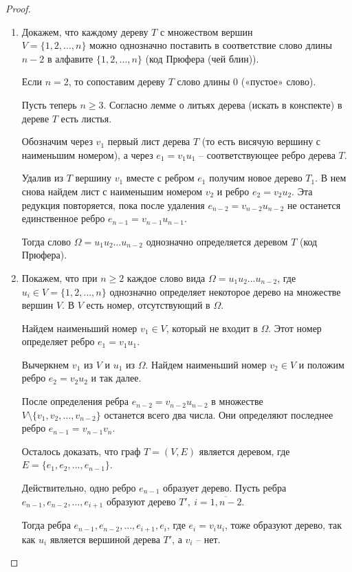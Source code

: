 \begin{proof}\leavevmode
    \begin{enumerate}
        \item Докажем, что каждому дереву $ T $ с множеством вершин \\ $ V = \{1,2,\ldots,n\} $ можно однозначно поставить в соответствие слово длины $ n-2 $ в алфавите $ \{1,2,\ldots,n\} $ (код Прюфера (чей блин)).

              Если $ n=2 $, то сопоставим дереву $ T $ слово длины $ 0 $ («пустое» слово).

              Пусть теперь $ n \geqslant 3 $. Согласно лемме о литьях дерева (искать в конспекте) в дереве $ T $ есть листья.

              Обозначим через $ v_1 $ первый лист дерева $ T $ (то есть висячую вершину с наименьшим номером), а через $ e_1 = v_1u_1 $ -- соответствующее ребро дерева $ T $.

              Удалив из $ T $ вершину $ v_1 $ вместе с ребром $ e_1 $ получим новое дерево $ T_1 $. В нем снова найдем лист с наименьшим номером $ v_2 $ и ребро $ e_2 = v_2u_2 $. Эта редукция повторяется, пока после удаления $ e_{n-2} = v_{n-2}u_{n-2} $ не останется единственное ребро $ e_{n-1}=v_{n-1}u_{n-1} $.

              Тогда слово $ \Omega = u_1u_2\ldots u_{n-2} $ однозначно определяется деревом $ T $ (код Прюфера).

        \item Покажем, что при $ n \geqslant 2 $ каждое слово вида $ \Omega = u_1u_2\ldots u_{n-2} $, где $ u_i \in V = \{1,2,\ldots,n\} $ однозначно определяет некоторое дерево на множестве вершин $ V $. В $ V $ есть номер, отсутствующий в $ \Omega $.

              Найдем наименьший номер $ v_1 \in V $, который не входит в $ \Omega $. Этот номер определяет ребро $ e_1=v_1u_1 $.

              Вычеркнем $ v_1 $ из $ V $ и $ u_1 $ из $ \Omega $. Найдем наименьший номер $ v_2 \in V $ и положим ребро $ e_2 = v_2u_2 $ и так далее.

              После определения ребра $ e_{n-2}=v_{n-2}u_{n-2} $ в множестве \\ $ V\setminus\{v_1,v_2,\ldots,v_{n-2}\} $ останется всего два числа. Они определяют последнее ребро $ e_{n-1} = v_{n-1}v_n $.

              Осталось доказать, что граф $ T = (V,E) $ является деревом, где $ E = \{e_1,e_2,\ldots,e_{n-1}\} $.

              Действительно, одно ребро $ e_{n-1} $ образует дерево. Пусть ребра $ e_{n-1},e_{n-2},\ldots,e_{i+1} $ образуют дерево $ T', \ i = \overline{1,n-2} $.

              Тогда ребра $ e_{n-1},e_{n-2},\ldots,e_{i+1},e_i $, где $ e_i = v_iu_i $, тоже образуют дерево, так как $ u_i $ является вершиной дерева $ T' $, а $ v_i $ -- нет.
    \end{enumerate}
\end{proof}

